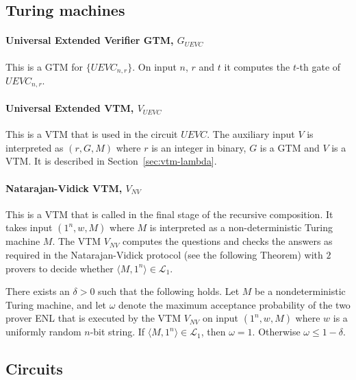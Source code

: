 \subsection{Turing machines}

\paragraph{Universal Extended Verifier GTM, $G_{UEVC}$} This is a GTM for $\{UEVC_{n,r}\}$. On input $n$, $r$ and $t$ it computes the $t$-th gate of $UEVC_{n,r}$.

\paragraph{Universal Extended VTM, $V_{UEVC}$} This is a VTM that is used in the circuit $UEVC$. The auxiliary input $V$ is interpreted as $(r,G,M)$ where $r$ is an integer in binary, $G$ is a GTM and $V$ is a VTM. It is described in Section~\ref{sec:vtm-lambda}. 

\paragraph{Natarajan-Vidick VTM, $V_{NV}$} This is a VTM that is called in the final stage of the recursive composition. It takes input $(1^n,w,M)$ where $M$ is interpreted as a non-deterministic Turing machine $M$. The VTM $V_{NV}$ computes the questions and checks the answers as required in the Natarajan-Vidick protocol (see the following Theorem) with $2$ provers to decide whether $\langle M, 1^n \rangle \in \mathcal{L}_1$.

\begin{theorem}\label{thm:nv}
There exists an $\delta > 0$ such that the following holds. Let $M$ be a nondeterministic Turing machine, and let $\omega$ denote the maximum acceptance probability of the two prover ENL that is executed by the VTM $V_{NV}$ on input $(1^n,w,M)$ where $w$ is a uniformly random $n$-bit string. If $\langle M, 1^n \rangle \in \mathcal{L}_1$, then $\omega = 1$. Otherwise $\omega \leq 1 - \delta$. 
\end{theorem}

\subsection{Circuits}
\label{sec:circuits}

